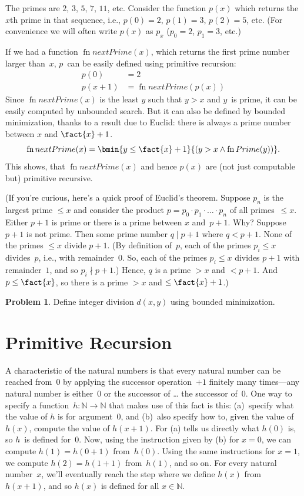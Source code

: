 \documentclass[10pt,a4paper]{article}
\theoremstyle{plain}
\theoremstyle{definition}
\newtheorem{prob}{Problem}[section]
\theoremstyle{remark}
\newcommand*{\olfileid}[3]{}
\newcommand*{\olsection}[1]{\section*{#1}}
\providecommand{\Nat}{\ensuremath{\mathbb{N}}}
\providecommand{\fn}{\operatorname{fn}}
\providecommand{\fn}{\operatorname{fn}}
\begin{document}
The primes are $2$, $3$, $5$, $7$, $11$, etc. Consider the function
$p(x)$ which returns the $x$th prime in that sequence, i.e., $p(0) =
2$, $p(1) = 3$, $p(2) = 5$, etc. (For convenience we will often write
$p(x)$ as $p_x$ ($p_0=2$, $p_1=3$, etc.)

If we had a function
$\fn{nextPrime(x)}$, which returns the first prime number larger
than~$x$, $p$~can be easily defined using primitive recursion:
\begin{align*}
  p(0) & = 2\\
  p(x+1) & = \fn{nextPrime}(p(x))
\end{align*}
Since $\fn{nextPrime}(x)$ is the least $y$ such that $y > x$ and
$y$~is prime, it can be easily computed by unbounded search. But it
can also be defined by bounded minimization, thanks to a result due to
Euclid: there is always a prime number between $x$ and $\fact{x}+1$.
\[
  \fn{nextPrime(x)} =
  \bmin{y \leq \fact{x}+1}{(y > x \land \fn{Prime}(y))}.
\]
This shows, that $\fn{nextPrime}(x)$ and hence $p(x)$ are (not just
computable but) primitive recursive.

(If you're curious, here's a quick proof of Euclid's theorem. Suppose
$p_n$ is the largest prime $\le x$ and consider the product $p =
p_0\cdot p_1 \cdot \dots \cdot p_n$ of all primes~$\le x$. Either
$p+1$ is prime or there is a prime between $x$ and~$p+1$.  Why?
Suppose $p+1$ is not prime. Then some prime number $q \mid p+1$ where
$q < p+1$. None of the primes $\le x$ divide $p+1$. (By definition
of~$p$, each of the primes $p_i \le x$ divides~$p$, i.e., with
remainder~$0$. So, each of the primes $p_i \le x$ divides $p+1$ with
remainder~$1$, and so $p_i \nmid p+1$.)  Hence, $q$ is a prime $>
x$ and $< p+1$.  And $p \le \fact{x}$, so there is a prime $> x$ and $\le
\fact{x}+1$.)

\begin{prob}
Define integer division $d(x, y)$ using bounded minimization.
\end{prob}





\olfileid{cmp}{rec}{pre}
\olsection{Primitive Recursion}

A characteristic of the natural numbers is that every natural number
can be reached from~$0$ by applying the successor operation~$+1$
finitely many times---any natural number is either~$0$ or the
successor of \dots{} the successor of~$0$. One way to specify a
function~$h\colon\Nat \to \Nat$ that makes use of this fact is this:
(a)~specify what the value of $h$ is for argument~$0$, and (b)~also
specify how to, given the value of $h(x)$, compute the value of
$h(x+1)$. For (a) tells us directly what $h(0)$ is, so $h$~is defined
for~$0$. Now, using the instruction given by (b) for $x=0$, we can
compute $h(1) = h(0+1)$ from~$h(0)$. Using the same instructions for
$x=1$, we compute $h(2) = h(1+1)$ from~$h(1)$, and so on. For every
natural number~$x$, we'll eventually reach the step where we define
$h(x)$ from $h(x+1)$, and so $h(x)$ is defined for all $x \in \Nat$.
\end{document}
